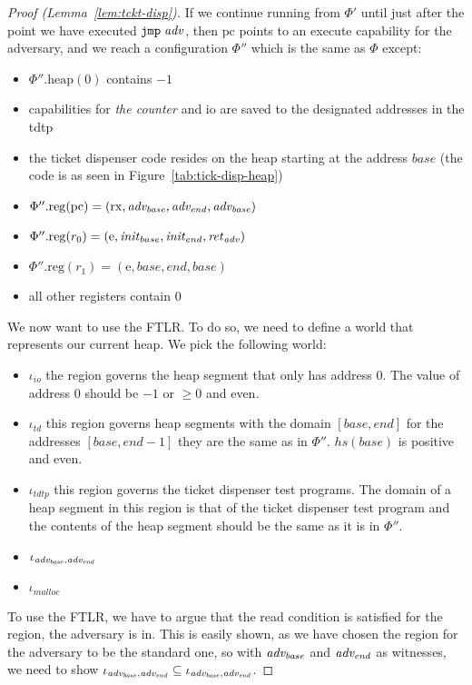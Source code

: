 \documentclass[a4paper]{article}
\newcommand{\var}[1]{\mathit{#1}}
\newcommand{\hs}{\var{hs}}
\newcommand{\pcreg}{\mathrm{pc}}
\newcommand{\plainproj}[1]{\mathrm{#1}}
\newcommand{\memheap}[1][\Phi]{#1.\plainproj{heap}}
\newcommand{\memreg}[1][\Phi]{#1.\plainproj{reg}}
\newcommand{\codelabel}[1]{\mathit{#1}}
\newcommand{\malloc}{\codelabel{malloc}}
\newcommand{\zinstr}[1]{\mathtt{#1}}
\newcommand{\oneinstr}[2]{\zinstr{#1} \; #2}
\newcommand{\jmp}[1]{\oneinstr{jmp}{#1}}
\newcommand{\plainperm}[1]{\mathrm{#1}}
\newcommand{\exec}{\plainperm{rx}}
\newcommand{\entry}{\plainperm{e}}
\begin{document}
\begin{proof}[Proof (Lemma~\ref{lem:tckt-disp})]
If we continue running from $\Phi'$ until just after the point we have executed $\jmp{\adv}$, then  $\pcreg$ points to an execute capability for the adversary, and  we reach a configuration $\Phi''$ which is the same as $\Phi$ except:
\begin{itemize}
\item $\memheap[\Phi''](0)$ contains $-1$
\item capabilities for \emph{the counter} and io are saved to the designated addresses in the tdtp
\item the ticket dispenser code resides on the heap starting at the address $\var{base}$ (the code is as seen in Figure~\ref{tab:tick-disp-heap})
\item $\memreg[\Phi''](\pcreg) = (\exec,\advb,\adve,\advb)$
\item $\memreg[\Phi''](r_0) = (\entry,\initb,\inite,\reta)$
\item $\memreg[\Phi''](r_1) = (\entry,\var{base},\var{end},\var{base})$
\item all other registers contain 0
\end{itemize}
We now want to use the FTLR. To do so, we need to define a world that represents our current heap. We pick the following world:
\begin{itemize}
\item $\iota_{\var{io}}$ the region governs the heap segment that only has address $0$. The value of address $0$ should be $-1$ or $\geq 0$ and even.  %
\item $\iota_{\var{td}}$ this region governs heap segments with the domain $[\var{base},\var{end}]$ for the addresses $[\var{base},\var{end} - 1]$ they are the same as in $\Phi''$. $\hs(\var{base})$ is positive and even.
\item $\iota_{\var{tdtp}}$ this region governs the ticket dispenser test programs. The domain of a heap segment in this region is that of the ticket dispenser test program and the contents of the heap segment should be the same as it is in $\Phi''$.
\item $\iota_{\advb,\adve}$
\item $\iota_{\malloc}$
\end{itemize}
To use the FTLR, we have to argue that the read condition is satisfied for the region, the adversary is in. This is easily shown, as we have chosen the region for the adversary to be the standard one, so with $\advb$ and $\adve$ as witnesses, we need to show $\iota_{\advb,\adve} \subseteq \iota_{\advb,\adve}$.


\end{proof}
\end{document}

